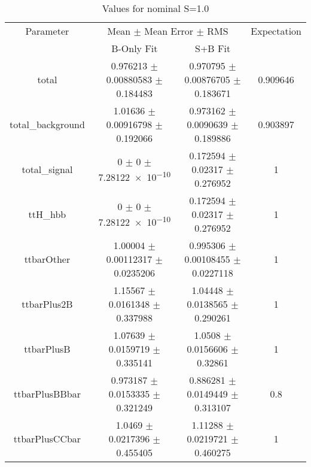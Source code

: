 \begin{table}
\centering
\caption{Values for nominal S=1.0}
\begin{tabular}{cccc}
\toprule
Parameter & \multicolumn{2}{c}{Mean $\pm$ Mean Error $\pm$ RMS} & Expectation\\
 & B-Only Fit & S+B Fit & \\
\midrule
total & \num{0.976213} $\pm$ \num{0.00880583} $\pm$ \num{0.184483} & \num{0.970795} $\pm$ \num{0.00876705} $\pm$ \num{0.183671} & \num{0.909646}\\
total\_background & \num{1.01636} $\pm$ \num{0.00916798} $\pm$ \num{0.192066} & \num{0.973162} $\pm$ \num{0.0090639} $\pm$ \num{0.189886} & \num{0.903897}\\
total\_signal & \num{0} $\pm$ \num{0} $\pm$ \num{7.28122e-10} & \num{0.172594} $\pm$ \num{0.02317} $\pm$ \num{0.276952} & \num{1}\\
ttH\_hbb & \num{0} $\pm$ \num{0} $\pm$ \num{7.28122e-10} & \num{0.172594} $\pm$ \num{0.02317} $\pm$ \num{0.276952} & \num{1}\\
ttbarOther & \num{1.00004} $\pm$ \num{0.00112317} $\pm$ \num{0.0235206} & \num{0.995306} $\pm$ \num{0.00108455} $\pm$ \num{0.0227118} & \num{1}\\
ttbarPlus2B & \num{1.15567} $\pm$ \num{0.0161348} $\pm$ \num{0.337988} & \num{1.04448} $\pm$ \num{0.0138565} $\pm$ \num{0.290261} & \num{1}\\
ttbarPlusB & \num{1.07639} $\pm$ \num{0.0159719} $\pm$ \num{0.335141} & \num{1.0508} $\pm$ \num{0.0156606} $\pm$ \num{0.32861} & \num{1}\\
ttbarPlusBBbar & \num{0.973187} $\pm$ \num{0.0153335} $\pm$ \num{0.321249} & \num{0.886281} $\pm$ \num{0.0149449} $\pm$ \num{0.313107} & \num{0.8}\\
ttbarPlusCCbar & \num{1.0469} $\pm$ \num{0.0217396} $\pm$ \num{0.455405} & \num{1.11288} $\pm$ \num{0.0219721} $\pm$ \num{0.460275} & \num{1}\\
\bottomrule
\end{tabular}
\end{table}